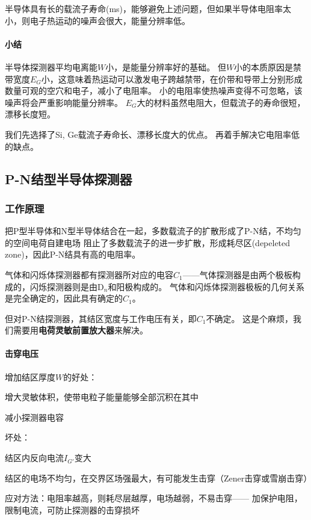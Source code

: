 半导体具有长的载流子寿命(ms)，能够避免上述问题，但如果半导体电阻率太小，则电子热运动的噪声会很大，能量分辨率低。
\paragraph{小结}
半导体探测器平均电离能$W$小，是能量分辨率好的基础。
但$W$小的本质原因是禁带宽度$E_G$小，这意味着热运动可以激发电子跨越禁带，在价带和导带上分别形成数量可观的空穴和电子，减小了电阻率。
小的电阻率使热噪声变得不可忽略，该噪声将会严重影响能量分辨率。
$E_G$大的材料虽然电阻大，但载流子的寿命很短，漂移长度短。

我们先选择了Si, Ge载流子寿命长、漂移长度大的优点。
再着手解决它电阻率低的缺点。
\subsection{P-N结型半导体探测器}
\subsubsection{工作原理}
把P型半导体和N型半导体结合在一起，多数载流子的扩散形成了P-N结，不均匀的空间电荷自建电场
阻止了多数载流子的进一步扩散，形成耗尽区(depeleted zone)，因此P-N结具有高的电阻率。

气体和闪烁体探测器都有探测器所对应的电容$C_1$——气体探测器是由两个极板构成的，闪烁探测器则是由D$_n$和阳极构成的。%
气体和闪烁体探测器极板的几何关系是完全确定的，因此具有确定的$C_1$。

但对P-N结探测器，其结区宽度与工作电压有关，即$C_1$不确定。
这是个麻烦，我们需要用\textbf{电荷灵敏前置放大器}来解决。
\paragraph{击穿电压}
增加结区厚度$W$的好处：
\begin{compactitem}
	\item 增大灵敏体积，使带电粒子能量能够全部沉积在其中
	\item 减小探测器电容
\end{compactitem}
坏处：
\begin{compactenum}
	\item 结区内反向电流$I_{G'}$变大
	\item 结区的电场不均匀，在交界区场强最大，有可能发生击穿（Zener击穿或雪崩击穿）
\end{compactenum}
应对方法：电阻率越高，则耗尽层越厚，电场越弱，不易击穿——
加保护电阻，限制电流，可防止探测器的击穿损坏
